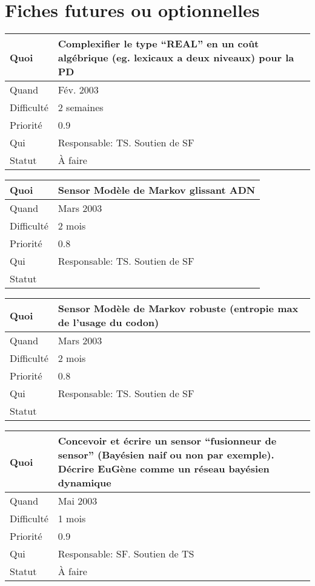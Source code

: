 \documentclass[a4paper,11pt]{article}
\begin{document}
\section{Fiches futures ou optionnelles}

\begin{longtable}{|l|p{7cm}|}\hline
  Quoi & Complexifier le type ``REAL'' en un co\^ut alg\'ebrique
  (eg. lexicaux a deux niveaux) pour la PD\\\hline
  Quand  & F\'ev. 2003 \\\hline
  Difficult\'e &  2 semaines\\\hline
  Priorit\'e &  0.9\\\hline
  Qui & Responsable: TS. Soutien de SF\\\hline
  Statut & \`A faire\\\hline
\end{longtable}

\begin{longtable}{|l|p{7cm}|}\hline
  Quoi & Sensor Mod\`ele de Markov glissant ADN \\\hline
  Quand  &  Mars 2003 \\\hline
  Difficult\'e &  2 mois \\\hline
  Priorit\'e &  0.8 \\\hline
  Qui & Responsable: TS. Soutien de SF\\\hline
  Statut & \\\hline
\end{longtable}

\begin{longtable}{|l|p{7cm}|}\hline
  Quoi & Sensor Mod\`ele de Markov robuste (entropie max de l'usage du codon)\\\hline
  Quand  &  Mars 2003\\\hline
  Difficult\'e &  2 mois\\\hline
  Priorit\'e &  0.8\\\hline
  Qui & Responsable: TS. Soutien de SF\\\hline
  Statut & \\\hline
\end{longtable}

\begin{longtable}{|l|p{7cm}|}\hline
  Quoi & Concevoir et \'ecrire un sensor ``fusionneur de sensor''
  (Bay\'esien naif ou non par exemple). D\'ecrire EuG\`ene comme un r\'eseau
  bay\'esien dynamique\\\hline
  Quand  &  Mai 2003\\\hline
  Difficult\'e & 1 mois \\\hline
  Priorit\'e &  0.9\\\hline
  Qui & Responsable: SF. Soutien de TS \\\hline
  Statut & \`A faire \\\hline
\end{longtable}
 
\end{document}
